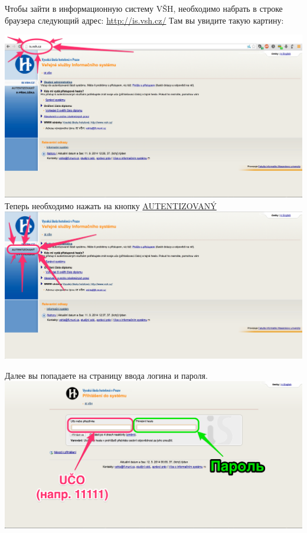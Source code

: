 \documentclass[a4paper,12pt]{article}
\begin{document}
Чтобы зайти в информационную систему VŠH, необходимо набрать 
в строке браузера следующий адрес: \url{http://is.vsh.cz/}
Там вы увидите такую картину:

\includegraphics[width=\textwidth]{s01} \\

Теперь необходимо нажать на кнопку \href{http://is.vsh.cz/auth}{AUTENTIZOVANÝ} \\

\includegraphics[width=\textwidth]{s02} \\

\newpage

Далее вы попадаете на страницу ввода логина и пароля. \\

\includegraphics[width=\textwidth]{s03} \\
\end{document}
